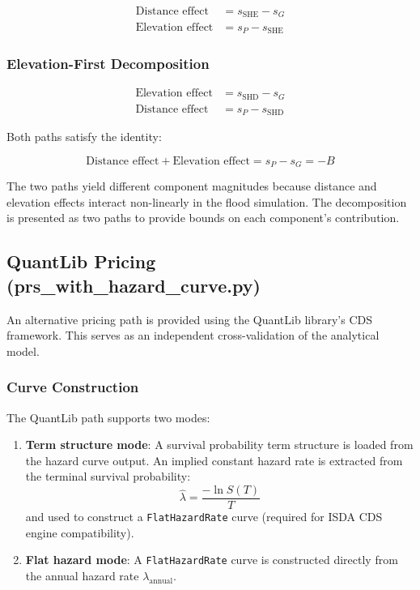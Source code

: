 \documentclass[11pt,a4paper]{article}
\begin{document}
\begin{align}
    \text{Distance effect} &= s_{\text{SHE}} - s_G \label{eq:dist_first_d} \\
    \text{Elevation effect} &= s_P - s_{\text{SHE}} \label{eq:dist_first_e}
\end{align}

\subsubsection{Elevation-First Decomposition}

\begin{align}
    \text{Elevation effect} &= s_{\text{SHD}} - s_G \label{eq:elev_first_e} \\
    \text{Distance effect} &= s_P - s_{\text{SHD}} \label{eq:elev_first_d}
\end{align}

Both paths satisfy the identity:

\begin{equation}
    \text{Distance effect} + \text{Elevation effect} = s_P - s_G = -B
    \label{eq:decomp_identity}
\end{equation}

\noindent The two paths yield different component magnitudes because distance and
elevation effects interact non-linearly in the flood simulation. The decomposition is
presented as two paths to provide bounds on each component's contribution.

\subsection{QuantLib Pricing (prs\_with\_hazard\_curve.py)}
\label{sec:quantlib}

An alternative pricing path is provided using the QuantLib library's CDS framework.
This serves as an independent cross-validation of the analytical model.

\subsubsection{Curve Construction}

The QuantLib path supports two modes:

\begin{enumerate}[nosep]
    \item \textbf{Term structure mode}: A survival probability term structure is loaded
          from the hazard curve output. An implied constant hazard rate is extracted from
          the terminal survival probability:
          \begin{equation}
              \hat{\lambda} = \frac{-\ln S(T)}{T}
          \end{equation}
          and used to construct a \texttt{FlatHazardRate} curve (required for ISDA CDS
          engine compatibility).
    \item \textbf{Flat hazard mode}: A \texttt{FlatHazardRate} curve is constructed
          directly from the annual hazard rate $\lambda_{\text{annual}}$.
\end{enumerate}
\end{document}
